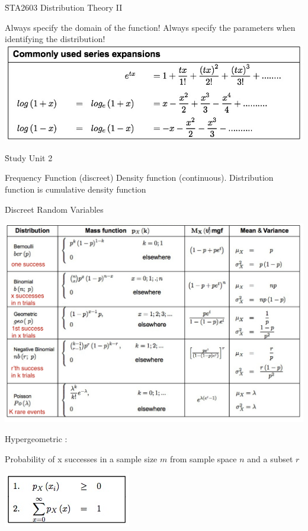 \documentclass{/out/app/latex/examnotes}
\begin{document}
\obeylines

\h{STA2603 Distribution Theory II}

\ra Always specify the domain of the function!
\ra Always specify the parameters when identifying the distribution!
\vspace{6pt}
\includegraphics[scale=0.6]{./img/expan.jpg}

\h{Study Unit 2}

\ra Frequency Function (discreet)
\ra Density function (continuous).
\ra Distribution function is cumulative density function

\h{Discreet Random Variables}

\includegraphics[scale=0.5]{./img/disscreet.jpg}

\disobeylines
Hypergeometric :
\obeylines

Probability of x successes in a sample size $m$ from sample space $n$ and a subset $r$  

\includegraphics[scale=0.8]{./img/2dis.jpg}
\end{document}
